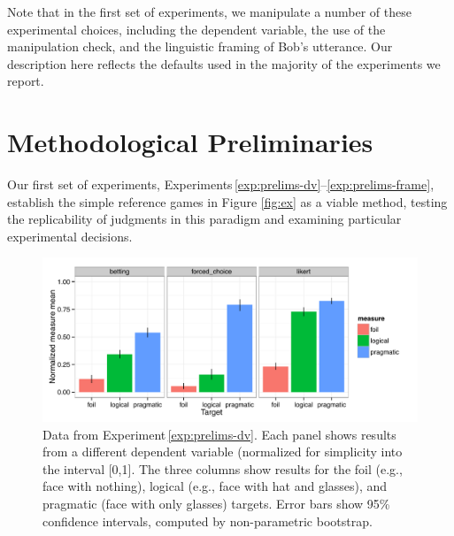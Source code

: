 \documentclass[man,noapacite]{apa2}
\newcounter{Experiment}
\newcommand{\exptref}[1]{Experiment\,\ref{#1}}
\newcommand{\exptrefrange}[2]{Experiments\,\ref{#1}--\ref{#2}}
\begin{document}
Note that in the first set of experiments, we manipulate a number of these experimental choices, including the dependent variable, the use of the manipulation check, and the linguistic framing of Bob's utterance. Our description here reflects the defaults used in the majority of the experiments we report.



\section{Methodological Preliminaries}
\label{sec:prelims}

Our first set of experiments, \exptrefrange{exp:prelims-dv}{exp:prelims-frame}, establish the simple reference games in Figure \ref{fig:ex} as a viable method, testing the replicability of judgments in this paradigm and examining particular experimental decisions.

\begin{figure}[t]
  \centering
  \includegraphics[width=6in]{../plots/1-prelims-dv.pdf}
  \caption{\label{fig:prelims-dv} Data from \exptref{exp:prelims-dv}. Each panel shows results from a different dependent variable (normalized for simplicity into the interval [0,1]. The three columns show results for the foil (e.g., face with nothing), logical (e.g., face with hat and glasses), and pragmatic (face with only glasses) targets. Error bars show 95\% confidence intervals, computed by non-parametric bootstrap.}
\end{figure}
\end{document}
